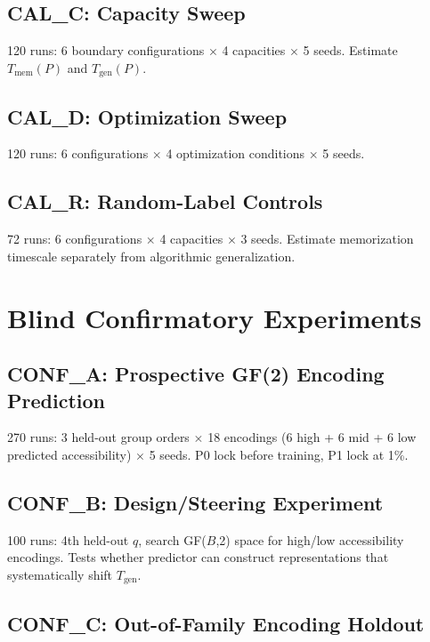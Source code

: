 \documentclass[11pt]{article}
\begin{document}
\subsection{CAL\_C: Capacity Sweep}

120 runs: 6 boundary configurations $\times$ 4 capacities $\times$ 5 seeds. Estimate $T_{\text{mem}}(P)$ and $T_{\text{gen}}(P)$.

\subsection{CAL\_D: Optimization Sweep}

120 runs: 6 configurations $\times$ 4 optimization conditions $\times$ 5 seeds.

\subsection{CAL\_R: Random-Label Controls}

72 runs: 6 configurations $\times$ 4 capacities $\times$ 3 seeds. Estimate memorization timescale separately from algorithmic generalization.

\section{Blind Confirmatory Experiments}\label{sec:confirmatory}

\subsection{CONF\_A: Prospective GF(2) Encoding Prediction}

270 runs: 3 held-out group orders $\times$ 18 encodings (6 high + 6 mid + 6 low predicted accessibility) $\times$ 5 seeds. P0 lock before training, P1 lock at 1\%.

\subsection{CONF\_B: Design/Steering Experiment}

100 runs: 4th held-out $q$, search GF($B$,2) space for high/low accessibility encodings. Tests whether predictor can construct representations that systematically shift $T_{\text{gen}}$.

\subsection{CONF\_C: Out-of-Family Encoding Holdout}
\end{document}
